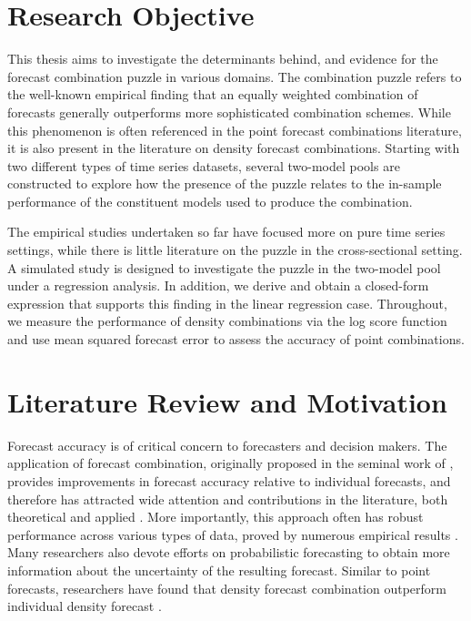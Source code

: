 \documentclass{monashthesis}
\begin{document}
\hypertarget{research-objective}{%
\section{Research Objective}\label{research-objective}}

This thesis aims to investigate the determinants behind, and evidence for the forecast combination puzzle in various domains. The combination puzzle refers to the well-known empirical finding that an equally weighted combination of forecasts generally outperforms more sophisticated combination schemes. While this phenomenon is often referenced in the point forecast combinations literature, it is also present in the literature on density forecast combinations. Starting with two different types of time series datasets, several two-model pools are constructed to explore how the presence of the puzzle relates to the in-sample performance of the constituent models used to produce the combination.

The empirical studies undertaken so far have focused more on pure time series settings, while there is little literature on the puzzle in the cross-sectional setting. A simulated study is designed to investigate the puzzle in the two-model pool under a regression analysis. In addition, we derive and obtain a closed-form expression that supports this finding in the linear regression case. Throughout, we measure the performance of density combinations via the log score function and use mean squared forecast error to assess the accuracy of point combinations.

\hypertarget{literature-review-and-motivation}{%
\section{Literature Review and Motivation}\label{literature-review-and-motivation}}

Forecast accuracy is of critical concern to forecasters and decision makers. The application of forecast combination, originally proposed in the seminal work of \textcite{BG69}, provides improvements in forecast accuracy relative to individual forecasts, and therefore has attracted wide attention and contributions in the literature, both theoretical and applied \autocite{C89,T06}. More importantly, this approach often has robust performance across various types of data, proved by numerous empirical results \autocite{GA11}. Many researchers also devote efforts on probabilistic forecasting to obtain more information about the uncertainty of the resulting forecast. Similar to point forecasts, researchers have found that density forecast combination outperform individual density forecast \autocites[e.g.,][]{HM07,GA11}.
\end{document}
